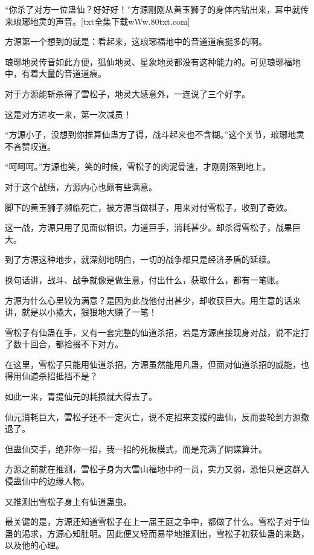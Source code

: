 
\begin{this_body}

“你杀了对方一位蛊仙？好好好！”方源刚刚从黄玉狮子的身体内钻出来，耳中就传来琅琊地灵的声音。[txt全集下载wWw.80txt.com]

方源第一个想到的就是：看起来，这琅琊福地中的音道道痕挺多的啊。

琅琊地灵传音如此方便，狐仙地灵、星象地灵都没有这种能力的。可见琅琊福地中，有着大量的音道道痕。

对于方源能斩杀得了雪松子，地灵大感意外，一连说了三个好字。

这是对方进攻一来，第一次减员！

“方源小子，没想到你推算仙蛊方了得，战斗起来也不含糊。”这个关节，琅琊地灵不吝赞叹道。

“呵呵呵。”方源也笑，笑的时候，雪松子的肉泥骨渣，才刚刚落到地上。

对于这个战绩，方源内心也颇有些满意。

脚下的黄玉狮子濒临死亡，被方源当做棋子，用来对付雪松子，收到了奇效。

这一战，方源只用了见面似相识，力道巨手，消耗甚少。却杀得雪松子，战果巨大。

到了方源这种地步，就深刻地明白，一切的战争都只是经济矛盾的延续。

换句话讲，战斗、战争就像是做生意，付出什么，获取什么，都有一笔账。

方源为什么心里较为满意？是因为此战他付出甚少，却收获巨大。用生意的话来讲，就是以小撬大，狠狠地大赚了一笔！

雪松子有仙蛊在手，又有一套完整的仙道杀招，若是方源直接现身对战，说不定打了数十回合，都拾掇不下对方。

在这里，雪松子只能用仙道杀招，方源虽然能用凡蛊，但面对仙道杀招的威能，也得用仙道杀招抵挡不是？

如此一来，青提仙元的耗损就大得去了。

仙元消耗巨大，雪松子还不一定灭亡，说不定招来支援的蛊仙，反而要轮到方源撤退了。

但蛊仙交手，绝非你一招，我一招的死板模式，而是充满了阴谋算计。

方源之前就在推测，雪松子身为大雪山福地中的一员，实力又弱，恐怕只是这群入侵蛊仙中的边缘人物。

又推测出雪松子身上有仙道蛊虫。

最关键的是，方源还知道雪松子在上一届王庭之争中，都做了什么。雪松子对于仙蛊的渴求，方源心知肚明。因此便又轻而易举地推测出，雪松子初获仙蛊的来路，以及他的心理。


\end{this_body}
